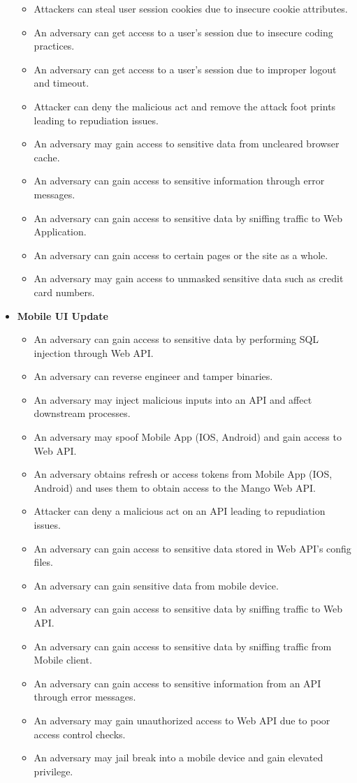\begin{itemize}
\begin{itemize}
        \item Attackers can steal user session cookies due to insecure cookie attributes.
        \item An adversary can get access to a user's session due to insecure coding practices.
        \item An adversary can get access to a user's session due to improper logout and timeout.
        \item Attacker can deny the malicious act and remove the attack foot prints leading to repudiation issues.
        \item An adversary may gain access to sensitive data from uncleared browser cache.
        \item An adversary can gain access to sensitive information through error messages.
        \item An adversary can gain access to sensitive data by sniffing traffic to Web Application.
        \item An adversary can gain access to certain pages or the site as a whole.
        \item An adversary may gain access to unmasked sensitive data such as credit card numbers.
    \end{itemize}
    \item \textbf{Mobile UI Update}
    \begin{itemize}
        \item An adversary can gain access to sensitive data by performing SQL injection through Web API.
        \item An adversary can reverse engineer and tamper binaries.
        \item An adversary may inject malicious inputs into an API and affect downstream processes.
        \item An adversary may spoof Mobile App (IOS, Android) and gain access to Web API\@.
        \item An adversary obtains refresh or access tokens from Mobile App (IOS, Android) and uses them to
        obtain access to the Mango Web API\@.
        \item Attacker can deny a malicious act on an API leading to repudiation issues.
        \item An adversary can gain access to sensitive data stored in Web API's config files.
        \item An adversary can gain sensitive data from mobile device.
        \item An adversary can gain access to sensitive data by sniffing traffic to Web API\@.
        \item An adversary can gain access to sensitive data by sniffing traffic from Mobile client.
        \item An adversary can gain access to sensitive information from an API through error messages.
        \item An adversary may gain unauthorized access to Web API due to poor access control checks.
        \item An adversary may jail break into a mobile device and gain elevated privilege.
    \end{itemize}
\end{itemize}